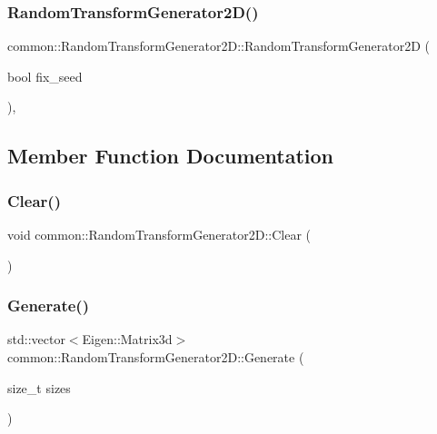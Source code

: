\subsubsection{\texorpdfstring{Random\+Transform\+Generator2\+D()}{RandomTransformGenerator2D()}}
{\footnotesize\ttfamily common\+::\+Random\+Transform\+Generator2\+D\+::\+Random\+Transform\+Generator2D (\begin{DoxyParamCaption}\item[{bool}]{fix\+\_\+seed }\end{DoxyParamCaption})\hspace{0.3cm}{\ttfamily [inline]}, {\ttfamily [explicit]}}



\subsection{Member Function Documentation}
\mbox{\label{classcommon_1_1RandomTransformGenerator2D_a3d77f6b3bee9e7e29d29b88cbd6d5a91}} 
\subsubsection{\texorpdfstring{Clear()}{Clear()}}
{\footnotesize\ttfamily void common\+::\+Random\+Transform\+Generator2\+D\+::\+Clear (\begin{DoxyParamCaption}{ }\end{DoxyParamCaption})\hspace{0.3cm}{\ttfamily [inline]}}

\mbox{\label{classcommon_1_1RandomTransformGenerator2D_a63a297d3a8ef1abf0625d00373a0b8c9}} 
\subsubsection{\texorpdfstring{Generate()}{Generate()}}
{\footnotesize\ttfamily std\+::vector$<$Eigen\+::\+Matrix3d$>$ common\+::\+Random\+Transform\+Generator2\+D\+::\+Generate (\begin{DoxyParamCaption}\item[{size\+\_\+t}]{sizes }\end{DoxyParamCaption})\hspace{0.3cm}{\ttfamily [inline]}}

